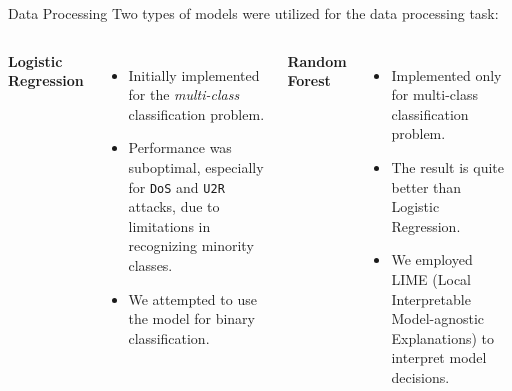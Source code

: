 \documentclass[12pt,aspectratio=169,notheorems]{beamer}
\begin{document}
\begin{frame}{Data Processing}
    \centering
    \small Two types of models were utilized for the data processing task:
    \vspace{0.4cm}

    \begin{columns}[T]
        \textbf{Logistic Regression}
        \begin{itemize}
        \setlength\itemsep{-0.3em}
            \item Initially implemented for the \emph{multi-class} classification problem.
            \item Performance was suboptimal, especially for \texttt{DoS} and \texttt{U2R} attacks, due to limitations in recognizing minority classes.
            \item We attempted to use the model for binary classification.
        \end{itemize}

        \textbf{Random Forest}
        \begin{itemize}
        \setlength\itemsep{-0.3em}
            \item Implemented only for multi-class classification problem.
            \item The result is quite better than Logistic Regression.
            \item We employed LIME (Local Interpretable Model-agnostic Explanations) to interpret model decisions.
        \end{itemize}
    \end{columns}
\end{frame}
\end{document}
